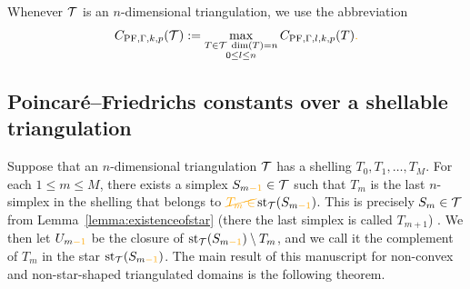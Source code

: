 \documentclass[10pt,letterpaper]{article}
\newcommand\cye[1]{%
  \protect\leavevmode
  \begingroup
    \color{red!35!yellow}%
    #1%
  \endgroup
}
\begin{document}
Whenever ${\mathcal T}$ is an $n$-dimensional triangulation, we use the abbreviation
\begin{align*}
    C_{\PF,\Gamma,k,p}(\calT) 
    :=
    \max\limits_{ \substack{ T \in \calT \; \dim(T)=n \\ 0 \leq l \leq n } }
    C_{\PF,\Gamma,l,k,p}(T) \cye{.}
\end{align*}

\subsection{\cye{Poincar\'e--Friedrichs constants over a shellable triangulation}}


Suppose that an $n$-dimensional triangulation ${\mathcal T}$ has a shelling $T_{0}, T_{1}, \dots, T_{M}$. 
For each $1 \leq m \leq M$, there exists a simplex $S_{m\cye{-1}} \in \calT$ 
such that $T_{m}$ is the last $n$-simplex in the shelling that belongs to $\cye{\cancel{T_{m} \in}} \patch_{\calT}(S_{m\cye{-1}})$. \cye{This is precisely $S_m \in {\mathcal T}$ from Lemma~\ref{lemma:existenceofstar} (there the last simplex is called $T_{m+1}$)}.
We then let $U_{m \cye{-1}}$ be the closure \cye{of} $\patch_{\calT}(S_{m\cye{-1}}) \setminus T_{m}$,
and we call it the complement of $T_{m}$ in the star $\patch_{\calT}(S_{m\cye{-1}})$. 
The main result of this manuscript \cye{for non-convex and non-star-shaped triangulated domains} is the following theorem. 
\end{document}
